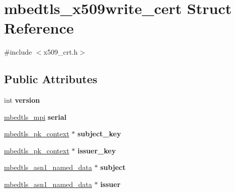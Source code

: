 \hypertarget{structmbedtls__x509write__cert}{\section{mbedtls\-\_\-x509write\-\_\-cert Struct Reference}
\label{structmbedtls__x509write__cert}
}


{\ttfamily \#include $<$x509\-\_\-crt.\-h$>$}

\subsection*{Public Attributes}
\begin{DoxyCompactItemize}
\item 
\hypertarget{structmbedtls__x509write__cert_a9efd79e9e5e9228c957728db5d03a459}{int {\bfseries version}}\label{structmbedtls__x509write__cert_a9efd79e9e5e9228c957728db5d03a459}

\item 
\hypertarget{structmbedtls__x509write__cert_ab7ff135f8e06151a37ad6f1a10ffac53}{\hyperlink{structmbedtls__mpi}{mbedtls\-\_\-mpi} {\bfseries serial}}\label{structmbedtls__x509write__cert_ab7ff135f8e06151a37ad6f1a10ffac53}

\item 
\hypertarget{structmbedtls__x509write__cert_ac340701cdf2c579031ee2a50116caccb}{\hyperlink{structmbedtls__pk__context}{mbedtls\-\_\-pk\-\_\-context} $\ast$ {\bfseries subject\-\_\-key}}\label{structmbedtls__x509write__cert_ac340701cdf2c579031ee2a50116caccb}

\item 
\hypertarget{structmbedtls__x509write__cert_a50ab1cded78af00e04dc3541f8855f6e}{\hyperlink{structmbedtls__pk__context}{mbedtls\-\_\-pk\-\_\-context} $\ast$ {\bfseries issuer\-\_\-key}}\label{structmbedtls__x509write__cert_a50ab1cded78af00e04dc3541f8855f6e}

\item 
\hypertarget{structmbedtls__x509write__cert_a952c4123df451d97b328cc5e4064b4e2}{\hyperlink{structmbedtls__asn1__named__data}{mbedtls\-\_\-asn1\-\_\-named\-\_\-data} $\ast$ {\bfseries subject}}\label{structmbedtls__x509write__cert_a952c4123df451d97b328cc5e4064b4e2}

\item 
\hypertarget{structmbedtls__x509write__cert_a6c66901676851921daa39a7cd194b39b}{\hyperlink{structmbedtls__asn1__named__data}{mbedtls\-\_\-asn1\-\_\-named\-\_\-data} $\ast$ {\bfseries issuer}}\label{structmbedtls__x509write__cert_a6c66901676851921daa39a7cd194b39b}


\end{DoxyCompactItemize}
